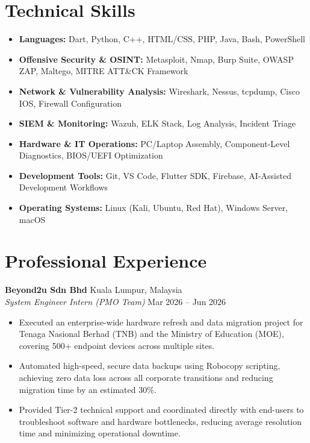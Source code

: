 \documentclass[a4paper,10pt]{article}
\begin{document}
\section*{Technical Skills}
\begin{itemize}[leftmargin=0.15in, label={}]
    \item \textbf{Languages:} Dart, Python, C++, HTML/CSS, PHP, Java, Bash, PowerShell
    \item \textbf{Offensive Security \& OSINT:} Metasploit, Nmap, Burp Suite, OWASP ZAP, Maltego, MITRE ATT\&CK Framework
    \item \textbf{Network \& Vulnerability Analysis:} Wireshark, Nessus, tcpdump, Cisco IOS, Firewall Configuration
    \item \textbf{SIEM \& Monitoring:} Wazuh, ELK Stack, Log Analysis, Incident Triage
    \item \textbf{Hardware \& IT Operations:} PC/Laptop Assembly, Component-Level Diagnostics, BIOS/UEFI Optimization
    \item \textbf{Development Tools:} Git, VS Code, Flutter SDK, Firebase, AI-Assisted Development Workflows
    \item \textbf{Operating Systems:} Linux (Kali, Ubuntu, Red Hat), Windows Server, macOS
\end{itemize}

\section*{Professional Experience}

\noindent
\textbf{Beyond2u Sdn Bhd} \hfill Kuala Lumpur, Malaysia \\
\textit{System Engineer Intern (PMO Team)} \hfill Mar 2026 -- Jun 2026
\begin{itemize}[leftmargin=0.2in]
    \item Executed an enterprise-wide hardware refresh and data migration project for Tenaga Nasional Berhad (TNB) and the Ministry of Education (MOE), covering 500+ endpoint devices across multiple sites.
    \item Automated high-speed, secure data backups using Robocopy scripting, achieving zero data loss across all corporate transitions and reducing migration time by an estimated 30\%.
    \item Provided Tier-2 technical support and coordinated directly with end-users to troubleshoot software and hardware bottlenecks, reducing average resolution time and minimizing operational downtime.
\end{itemize}
\end{document}
